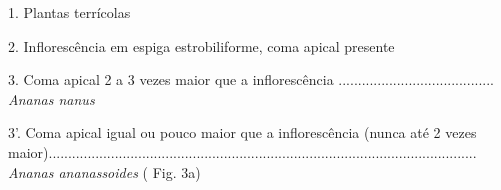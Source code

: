\begin{customList1}
\item \par{}1.\allowbreak{} Plantas terrícolas
\begin{customList1}
\item \par{}2.\allowbreak{} Inflorescência em espiga estrobiliforme,\allowbreak{} coma apical presente
\begin{customList1}
\item \par{}3.\allowbreak{} Coma apical 2 a 3 vezes maior que a inflorescência .\allowbreak{}.\allowbreak{}.\allowbreak{}.\allowbreak{}.\allowbreak{}.\allowbreak{}.\allowbreak{}.\allowbreak{}.\allowbreak{}.\allowbreak{}.\allowbreak{}.\allowbreak{}.\allowbreak{}.\allowbreak{}.\allowbreak{}.\allowbreak{}.\allowbreak{}.\allowbreak{}.\allowbreak{}.\allowbreak{}.\allowbreak{}.\allowbreak{}.\allowbreak{}.\allowbreak{}.\allowbreak{}.\allowbreak{}.\allowbreak{}.\allowbreak{}.\allowbreak{}.\allowbreak{}.\allowbreak{}.\allowbreak{}.\allowbreak{}.\allowbreak{}.\allowbreak{}.\allowbreak{}.\allowbreak{}.\allowbreak{}.\allowbreak{}.\allowbreak{} \textit{Ananas nanus }
\item \par{}3'.\allowbreak{} Coma apical igual ou pouco maior que a inflorescência (\allowbreak{}nunca até 2 vezes maior)\allowbreak{}.\allowbreak{}.\allowbreak{}.\allowbreak{}.\allowbreak{}.\allowbreak{}.\allowbreak{}.\allowbreak{}.\allowbreak{}.\allowbreak{}.\allowbreak{}.\allowbreak{}.\allowbreak{}.\allowbreak{}.\allowbreak{}.\allowbreak{}.\allowbreak{}.\allowbreak{}.\allowbreak{}.\allowbreak{}.\allowbreak{}.\allowbreak{}.\allowbreak{}.\allowbreak{}.\allowbreak{}.\allowbreak{}.\allowbreak{}.\allowbreak{}.\allowbreak{}.\allowbreak{}.\allowbreak{}.\allowbreak{}.\allowbreak{}.\allowbreak{}.\allowbreak{}.\allowbreak{}.\allowbreak{}.\allowbreak{}.\allowbreak{}.\allowbreak{}.\allowbreak{}.\allowbreak{}.\allowbreak{}.\allowbreak{}.\allowbreak{}.\allowbreak{}.\allowbreak{}.\allowbreak{}.\allowbreak{}.\allowbreak{}.\allowbreak{}.\allowbreak{}.\allowbreak{}.\allowbreak{}.\allowbreak{}.\allowbreak{}.\allowbreak{}.\allowbreak{}.\allowbreak{}.\allowbreak{}.\allowbreak{}.\allowbreak{}.\allowbreak{}.\allowbreak{}.\allowbreak{}.\allowbreak{}.\allowbreak{}.\allowbreak{}.\allowbreak{}.\allowbreak{}.\allowbreak{}.\allowbreak{}.\allowbreak{}.\allowbreak{}.\allowbreak{}.\allowbreak{}.\allowbreak{}.\allowbreak{}.\allowbreak{}.\allowbreak{}.\allowbreak{}.\allowbreak{}.\allowbreak{}.\allowbreak{}.\allowbreak{}.\allowbreak{}.\allowbreak{}.\allowbreak{}.\allowbreak{}.\allowbreak{}.\allowbreak{}.\allowbreak{}.\allowbreak{}.\allowbreak{}.\allowbreak{}.\allowbreak{}.\allowbreak{}.\allowbreak{}.\allowbreak{}.\allowbreak{}.\allowbreak{}.\allowbreak{}.\allowbreak{}.\allowbreak{}.\allowbreak{}.\allowbreak{}.\allowbreak{}.\allowbreak{}.\allowbreak{}.\allowbreak{}.\allowbreak{} \textit{Ananas ananassoides} (\allowbreak{} Fig.\allowbreak{} 3a)\allowbreak{}\par{}





\end{customList1}
\end{customList1}
\end{customList1}
